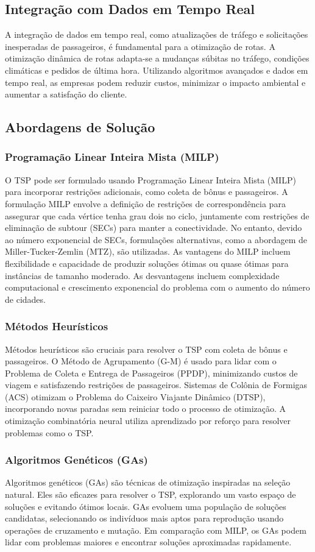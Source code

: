 \documentclass[12pt, a4paper]{report}
\begin{document}
\subsection*{Integração com Dados em Tempo Real}
A integração de dados em tempo real, como atualizações de tráfego e solicitações inesperadas de passageiros, é fundamental para a otimização de rotas. A otimização dinâmica de rotas adapta-se a mudanças súbitas no tráfego, condições climáticas e pedidos de última hora. Utilizando algoritmos avançados e dados em tempo real, as empresas podem reduzir custos, minimizar o impacto ambiental e aumentar a satisfação do cliente.
\subsection*{Abordagens de Solução}
\subsubsection*{Programação Linear Inteira Mista (MILP)}
O TSP pode ser formulado usando Programação Linear Inteira Mista (MILP) para incorporar restrições adicionais, como coleta de bônus e passageiros. A formulação MILP envolve a definição de restrições de correspondência para assegurar que cada vértice tenha grau dois no ciclo, juntamente com restrições de eliminação de subtour (SECs) para manter a conectividade. No entanto, devido ao número exponencial de SECs, formulações alternativas, como a abordagem de Miller-Tucker-Zemlin (MTZ), são utilizadas. As vantagens do MILP incluem flexibilidade e capacidade de produzir soluções ótimas ou quase ótimas para instâncias de tamanho moderado. As desvantagens incluem complexidade computacional e crescimento exponencial do problema com o aumento do número de cidades.
\subsubsection*{Métodos Heurísticos}
Métodos heurísticos são cruciais para resolver o TSP com coleta de bônus e passageiros. O Método de Agrupamento (G-M) é usado para lidar com o Problema de Coleta e Entrega de Passageiros (PPDP), minimizando custos de viagem e satisfazendo restrições de passageiros. Sistemas de Colônia de Formigas (ACS) otimizam o Problema do Caixeiro Viajante Dinâmico (DTSP), incorporando novas paradas sem reiniciar todo o processo de otimização. A otimização combinatória neural utiliza aprendizado por reforço para resolver problemas como o TSP.
\subsubsection*{Algoritmos Genéticos (GAs)}
Algoritmos genéticos (GAs) são técnicas de otimização inspiradas na seleção natural. Eles são eficazes para resolver o TSP, explorando um vasto espaço de soluções e evitando ótimos locais. GAs evoluem uma população de soluções candidatas, selecionando os indivíduos mais aptos para reprodução usando operações de cruzamento e mutação. Em comparação com MILP, os GAs podem lidar com problemas maiores e encontrar soluções aproximadas rapidamente.
\end{document}
